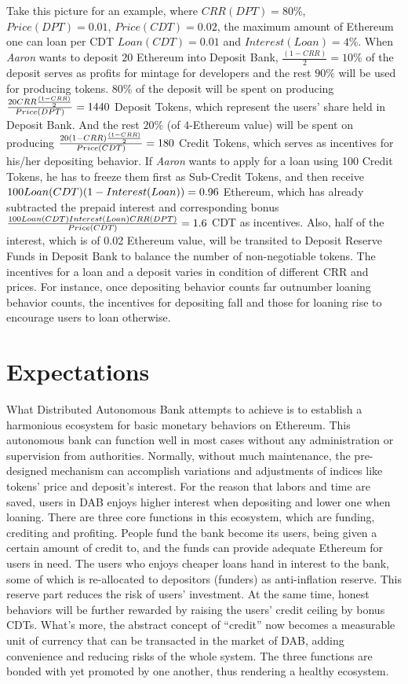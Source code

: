 \documentclass[review]{elsarticle}
\begin{document}
Take this picture for an example, where ${CRR(DPT) = 80\%}$, ${Price(DPT) = 0.01}$, ${Price(CDT) = 0.02}$,  the maximum amount of Ethereum one can loan per CDT ${Loan(CDT) = 0.01}$ and ${Interest(Loan) = 4\%}$. When \emph{Aaron} wants to deposit $20$ Ethereum into Deposit Bank, ${\frac{(1 - CRR)}{2} = 10\%}$ of the deposit serves as  profits for mintage for developers and the rest ${90\%}$ will be used for producing tokens. $80\%$ of the deposit will be spent on producing ${\frac{20 \* CRR \* \frac{(1 - CRR)}{2}}{Price(DPT)} = 1440}$ Deposit Tokens, which represent the users' share held in Deposit Bank. And the rest $20\%$ (of $4$-Ethereum value) will be spent on producing ${\frac{20 \* (1 - CRR) \* \frac{(1 - CRR)}{2}}{Price(CDT)} = 180}$ Credit Tokens, which serves as incentives for his/her depositing behavior. If \emph{Aaron} wants to apply for a loan using 100 Credit Tokens, he has to freeze them first as Sub-Credit Tokens, and then receive ${100 \* Loan(CDT) \* (1 - Interest(Loan)) = 0.96}$ Ethereum, which has already subtracted the prepaid interest and corresponding bonus ${\frac{100 \* Loan(CDT) \* Interest(Loan) \* CRR(DPT)}{Price(CDT)} = 1.6}$ CDT as incentives. Also, half of the interest, which is of 0.02 Ethereum value, will be transited to Deposit Reserve Funds in Deposit Bank to balance the number of non-negotiable tokens.
The incentives for a loan and a deposit varies in condition of different CRR and prices. For instance, once depositing behavior counts far outnumber loaning behavior counts, the incentives for depositing fall and those for loaning rise to encourage users to loan otherwise.

\section{Expectations}
What Distributed Autonomous Bank attempts to achieve is to establish a harmonious ecosystem for basic monetary behaviors on Ethereum. This autonomous bank can function well in most cases without any administration or supervision from authorities. Normally, without much maintenance, the pre-designed mechanism can accomplish variations and adjustments of indices like tokens' price and deposit's interest. For the reason that labors and time are saved, users in DAB enjoys higher interest when depositing and lower one when loaning.
There are three core functions in this ecosystem, which are funding, crediting and profiting. People fund the bank become its users, being given a certain amount of credit to, and the funds can provide adequate Ethereum for users in need. The users who enjoys cheaper loans hand in interest to the bank, some of which is re-allocated to depositors (funders) as anti-inflation reserve. This reserve part reduces the risk of users' investment.  At the same time, honest behaviors will be further rewarded by raising the users' credit ceiling by bonus CDTs. What's more, the abstract concept of ``credit'' now becomes a measurable unit of currency that can be transacted in the market of DAB, adding convenience and reducing risks of the whole system. The three functions are bonded with yet promoted by one another, thus rendering a healthy ecosystem.
\end{document}
